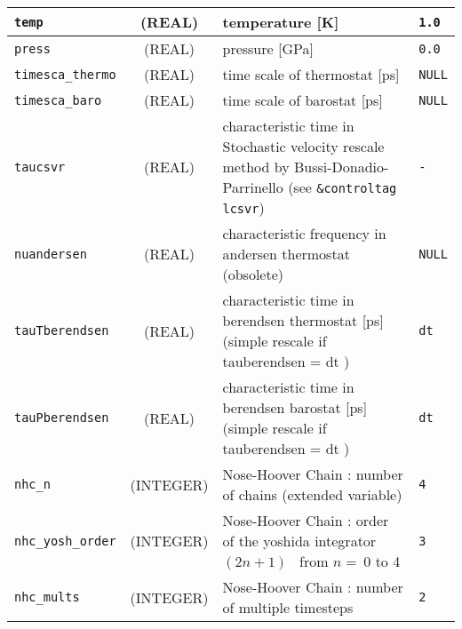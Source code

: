 \documentclass[a4paper,8pt]{article}
\begin{document}
\begin{longtable}{l|c|m{8cm}|m{2cm}}
\hline
\rule[-0.75cm]{0cm}{1.5cm}
\verb?temp?      & (REAL)             &  temperature [K]                                                                    & \verb?1.0?\\
\hline
\rule[-0.75cm]{0cm}{1.5cm}
\verb?press?     & (REAL)             &  pressure [GPa]                                                                     & \verb?0.0?\\
\hline
\rule[-0.75cm]{0cm}{1.5cm}
\verb?timesca_thermo? 
                 & (REAL)             &  time scale of thermostat [ps]                                                      & \verb?NULL? \\
\hline
\rule[-0.75cm]{0cm}{1.5cm}
\verb?timesca_baro?   
                 & (REAL)             &   time scale of barostat [ps]                                                       & \verb?NULL? \\
\hline
\rule[-0.75cm]{0cm}{1.5cm}
\verb?taucsvr?   & (REAL)             &  characteristic time in Stochastic velocity rescale method by 
                                         Bussi-Donadio-Parrinello (see \verb?&controltag lcsvr?)                            & \verb?-? \\
\hline
\rule[-0.75cm]{0cm}{1.5cm}
\verb?nuandersen?     
                 & (REAL)             &  characteristic frequency in andersen thermostat (obsolete)                         & \verb?NULL? \\
\hline
\rule[-0.75cm]{0cm}{1.5cm}
\verb?tauTberendsen?  
                 & (REAL)             &  characteristic time in berendsen thermostat [ps] 
                                         (simple rescale if tauberendsen = dt )                                             & \verb?dt? \\
\hline
\rule[-0.75cm]{0cm}{1.5cm}
\verb?tauPberendsen?  
                 & (REAL)             &  characteristic time in berendsen barostat [ps]
                                         (simple rescale if tauberendsen = dt )                                             & \verb?dt? \\
\hline
\rule[-0.75cm]{0cm}{1.5cm}
\verb?nhc_n?     & (INTEGER)          &  Nose-Hoover Chain : number of chains (extended variable)                           & \verb?4? \\
\hline
\rule[-0.75cm]{0cm}{1.5cm}
\verb?nhc_yosh_order? 
                 & (INTEGER)          &  Nose-Hoover Chain : order of the yoshida integrator 
                                         $(2n+1)$ \, from $n=~$0 to 4                                  & \verb?3? \\
\hline
\rule[-0.75cm]{0cm}{1.5cm}
\verb?nhc_mults?      
                 & (INTEGER)          &  Nose-Hoover Chain : number of multiple timesteps                                   & \verb?2? \\
\hline
\hline
\end{longtable}
\end{document}
